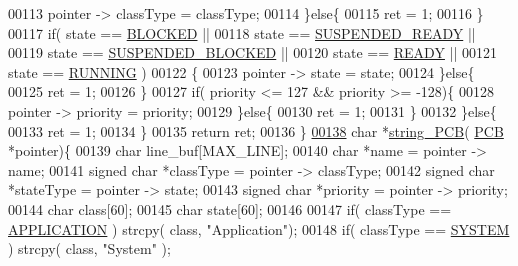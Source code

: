 \begin{DoxyCode}
00113                         pointer -> classType = classType;
00114                 \}\textcolor{keywordflow}{else}\{
00115                         ret = 1; 
00116                 \}
00117                  \textcolor{keywordflow}{if}( state == \hyperlink{mpx__r2_8h_a48f6457243719e7031768d4100741159}{BLOCKED} || 
00118                          state == \hyperlink{mpx__r2_8h_a07b1141143e8825b04670da23fca8cc7}{SUSPENDED_READY} || 
00119                      state == \hyperlink{mpx__r2_8h_a6e41bb5a80c5049e8d364bab8ee4d73a}{SUSPENDED_BLOCKED} ||
00120                          state == \hyperlink{mpx__r2_8h_ad1235d5ce36f7267285e82dccd428aa6}{READY} || 
00121                          state == \hyperlink{mpx__r2_8h_a6fb7181d994ee98e735494be55809708}{RUNNING} )
00122                 \{
00123                 pointer -> state = state;
00124                 \}\textcolor{keywordflow}{else}\{
00125                         ret = 1; 
00126                 \}
00127                 \textcolor{keywordflow}{if}( priority <= 127 && priority >= -128)\{ 
00128                         pointer -> priority = priority;
00129                 \}\textcolor{keywordflow}{else}\{
00130                         ret = 1;
00131                 \}
00132         \}\textcolor{keywordflow}{else}\{
00133                 ret = 1;
00134         \}
00135         \textcolor{keywordflow}{return} ret; 
00136 \}
\hypertarget{mpx__r2_8c_source_l00138}{}\hyperlink{mpx__r2_8c_aa1ebf78ebfc66e910acd6efdcf6b2437}{00138} \textcolor{keywordtype}{char} *\hyperlink{mpx__r2_8c_aa1ebf78ebfc66e910acd6efdcf6b2437}{string_PCB}( \hyperlink{structprocess}{PCB} *pointer)\{
00139         \textcolor{keywordtype}{char} line\_buf[MAX\_LINE];
00140         \textcolor{keywordtype}{char} *name = pointer -> name;
00141         \textcolor{keywordtype}{signed} \textcolor{keywordtype}{char} *classType = pointer -> classType;
00142         \textcolor{keywordtype}{signed} \textcolor{keywordtype}{char} *stateType = pointer -> state;
00143         \textcolor{keywordtype}{signed} \textcolor{keywordtype}{char} *priority = pointer -> priority;
00144         \textcolor{keywordtype}{char} \textcolor{keyword}{class}[60]; 
00145         \textcolor{keywordtype}{char} state[60]; 
00146         
00147         \textcolor{keywordflow}{if}( classType == \hyperlink{mpx__r2_8h_a796bd7c6ba2e59281760fb155c6287e8}{APPLICATION} ) strcpy( \textcolor{keyword}{class}, \textcolor{stringliteral}{"Application"});
00148         \textcolor{keywordflow}{if}( classType == \hyperlink{mpx__r2_8h_a21b97df85e65556468b28a576311271c}{SYSTEM} ) strcpy( \textcolor{keyword}{class}, \textcolor{stringliteral}{"System"} );

\end{DoxyCode}
